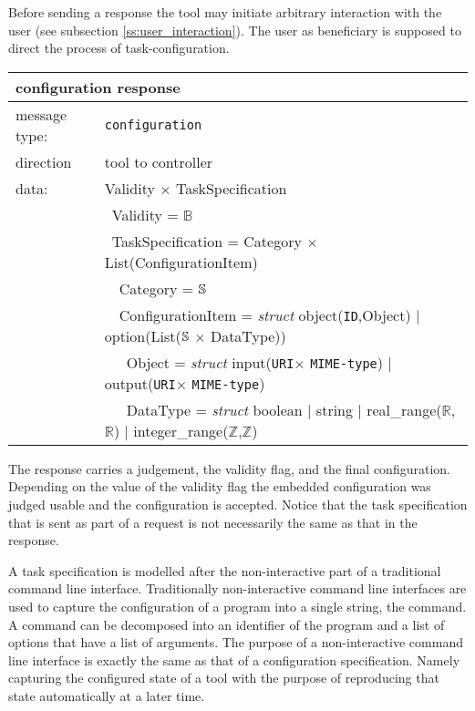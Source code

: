 \documentclass{article}
\newcommand{\msg}[1]{\texttt{#1}}
\newcommand{\String}{\ensuremath \mathbb{S}\xspace}
\newcommand{\Id}{\texttt{ID}\xspace}
\newcommand{\URI}{\texttt{URI}\xspace}
\newcommand{\MIMEtype}{\texttt{MIME-type}\xspace}
\begin{document}
   Before sending a response the tool may initiate arbitrary interaction with
   the user (see subsection \ref{ss:user_interaction}). The user as beneficiary
   is supposed to direct the process of task-configuration.

   \begin{table}[H]
    \begin{center}
     \begin{tabular}{|ll|}
      \hline
       \multicolumn{2}{|l|}{\textbf{configuration response}} \\
      \hline
       message type:   & \msg{configuration} \\
      \hline
       direction       & tool to controller \\
      \hline
       data:           & Validity $\times$ TaskSpecification \\
                       & \ Validity = $\mathbb{B}$ \\
                       & \ TaskSpecification = Category $\times$ List(ConfigurationItem) \\
                       & \ \ Category = $\String$ \\
                       & \ \ ConfigurationItem = \textit{struct} object(\Id,Object) $|$ option(List($\String$ $\times$ DataType)) \\
                       & \ \ \ Object = \textit{struct} input(\URI $\times$ \MIMEtype) $|$ output(\URI $\times$ \MIMEtype) \\
                       & \ \ \ DataType = \textit{struct} boolean $|$ string $|$ real\_range($\mathbb{R}$,$\mathbb{R}$) $|$ integer\_range($\mathbb{Z}$,$\mathbb{Z}$) \\
      \hline
     \end{tabular}
    \end{center}
    \vspace{-0.4cm}
   \end{table}

   \noindent The response carries a judgement, the validity flag, and the final
   configuration.  Depending on the value of the validity flag the embedded
   configuration was judged usable and the configuration is accepted. Notice
   that the task specification that is sent as part of a request is not
   necessarily the same as that in the response.

   A task specification  is modelled after the non-interactive part of a
   traditional command line interface.  Traditionally non-interactive command
   line interfaces are used to capture the configuration of a program into a
   single string, the command. A command can be decomposed into an identifier
   of the program and a list of options that have a list of arguments. The
   purpose of a non-interactive command line interface is exactly the same as
   that of a configuration specification.  Namely capturing the configured
   state of a tool with the purpose of reproducing that state automatically at
   a later time.
\end{document}
